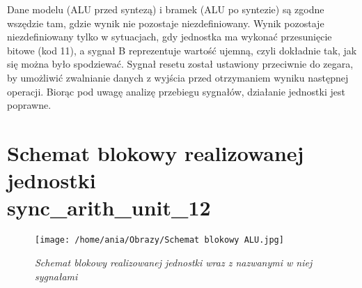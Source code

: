 \documentclass[12pt]{article}
\begin{document}
  Dane modelu (ALU przed syntezą) i bramek (ALU po syntezie) są zgodne wszędzie tam, gdzie wynik nie pozostaje niezdefiniowany. Wynik pozostaje niezdefiniowany tylko w sytuacjach, 
  gdy jednostka ma wykonać przesunięcie bitowe (kod 11), a sygnał B reprezentuje wartość ujemną, czyli dokładnie tak, jak się można było spodziewać. Sygnał resetu został ustawiony 
  przeciwnie do zegara, by umożliwić zwalnianie danych z wyjścia przed otrzymaniem wyniku następnej operacji. Biorąc pod uwagę analizę przebiegu sygnałów, działanie
  jednostki jest poprawne.


\section{Schemat blokowy realizowanej jednostki \\\textbf{sync\_arith\_unit\_12}}

\begin{figure}[h]
  \centering
  \texttt{[image: /home/ania/Obrazy/Schemat blokowy ALU.jpg]}
  \centering
  \caption{\textit{Schemat blokowy realizowanej jednostki wraz z nazwanymi w niej sygnałami}}
  \end{figure}
\end{document}
